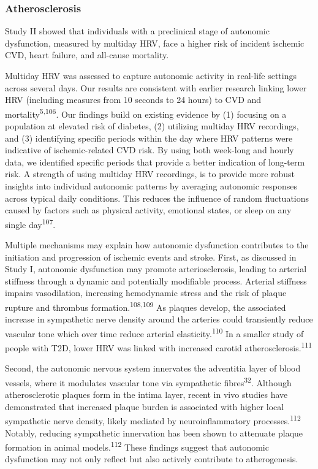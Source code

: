 \documentclass[
  letterpaper,
  headsepline=true,
  open=any]{scrbook}
\begin{document}
\hypertarget{atherosclerosis-1}{%
\subsubsection{Atherosclerosis}\label{atherosclerosis-1}}

Study II showed that individuals with a preclinical stage of autonomic
dysfunction, measured by multiday HRV, face a higher risk of incident
ischemic CVD, heart failure, and all-cause mortality.

Multiday HRV was assessed to capture autonomic activity in real-life
settings across several days. Our results are consistent with earlier
research linking lower HRV (including measures from 10 seconds to 24
hours) to CVD and mortality\textsuperscript{5,106}. Our findings build
on existing evidence by (1) focusing on a population at elevated risk of
diabetes, (2) utilizing multiday HRV recordings, and (3) identifying
specific periods within the day where HRV patterns were indicative of
ischemic-related CVD risk. By using both week-long and hourly data, we
identified specific periods that provide a better indication of
long-term risk. A strength of using multiday HRV recordings, is to
provide more robust insights into individual autonomic patterns by
averaging autonomic responses across typical daily conditions. This
reduces the influence of random fluctuations caused by factors such as
physical activity, emotional states, or sleep on any single
day\textsuperscript{107}.

Multiple mechanisms may explain how autonomic dysfunction contributes to
the initiation and progression of ischemic events and stroke. First, as
discussed in Study I, autonomic dysfunction may promote
arteriosclerosis, leading to arterial stiffness through a dynamic and
potentially modifiable process. Arterial stiffness impairs vasodilation,
increasing hemodynamic stress and the risk of plaque rupture and
thrombus formation.\textsuperscript{108,109} As plaques develop, the
associated increase in sympathetic nerve density around the arteries
could transiently reduce vascular tone which over time reduce arterial
elasticity.\textsuperscript{110} In a smaller study of people with T2D,
lower HRV was linked with increased carotid
atherosclerosis.\textsuperscript{111}

Second, the autonomic nervous system innervates the adventitia layer of
blood vessels, where it modulates vascular tone via sympathetic
fibres\textsuperscript{32}. Although atherosclerotic plaques form in the
intima layer, recent in vivo studies have demonstrated that increased
plaque burden is associated with higher local sympathetic nerve density,
likely mediated by neuroinflammatory processes.\textsuperscript{112}
Notably, reducing sympathetic innervation has been shown to attenuate
plaque formation in animal models.\textsuperscript{112} These findings
suggest that autonomic dysfunction may not only reflect but also
actively contribute to atherogenesis.
\end{document}
